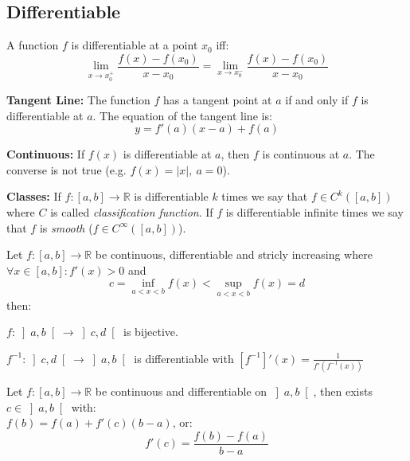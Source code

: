 \documentclass[8pt,a4paper]{extarticle}     %
\theoremstyle{definition}
\theoremstyle{definition}
\theoremstyle{definition}
\newcommand{\R}{\mathbb{R}}
\begin{document}
\begin{multicols}{4}
\subsection{Differentiable}
\begin{boxtheorem}[Differentiable]
	A function $f$ is differentiable at a point $x_0$ iff:
	$$\lim_{x \to x_{0}^+} \frac{f(x)-f(x_0)}{x-x_0} = \lim_{x \to x_{0}^-} \frac{f(x)-f(x_0)}{x-x_0}$$
\end{boxtheorem}
\begin{eqlist}
	\item \textbf{Tangent Line:} The function $f$ has a tangent point at $a$ if and only if $f$ is differentiable at $a$. The equation of the tangent line is:
	$$y = f'(a)(x-a)+f(a)$$
	\item \textbf{Continuous:} If $f(x)$ is differentiable at $a$, then $f$ is continuous at $a$. The converse is not true (e.g. $f(x) = |x|, \ a=0$).
	\item \textbf{Classes:} If $f:[a,b] \rightarrow \R$ is differentiable $k$ times we say that $f \in C^k([a,b])$ where $C$ is called \textit{classification function}. If $f$ is differentiable infinite times we say that $f$ is \textit{smooth} ($f \in C^\infty([a,b])$). 
\end{eqlist}

\begin{boxtheorem}
	Let $f: [a,b] \longrightarrow \R$ be continuous, differentiable and stricly increasing where $\forall x\in[a,b]: f'(x)>0$ and $$c = \underset{a<x<b}{\inf} f(x) < \underset{a<x<b}{\sup} f(x) = d$$ then: 
	\begin{bulletlist}
		\item $f:\left]a,b\right[\rightarrow\left]c,d\right[$ is bijective.
		\item $f^{-1}:\left]c,d\right[\rightarrow\left]a,b\right[$ is differentiable with $[f^{-1}]'(x) = \frac{1}{f'(f^{-1}(x))}$
	\end{bulletlist}
\end{boxtheorem}

\begin{boxtheorem}
	Let $f: [a,b] \longrightarrow \R$ be continuous and differentiable on $\left]a,b\right[$, then exists $c\in\left]a,b\right[$ with: \\
	$f(b) = f(a) + f'(c)(b-a) \text{, or:}$
	$$f'(c) = \frac{f(b)-f(a)}{b-a}$$
\end{boxtheorem}


\vfill\null
\columnbreak
\vfill\null
\columnbreak


\end{multicols}
\end{document}
